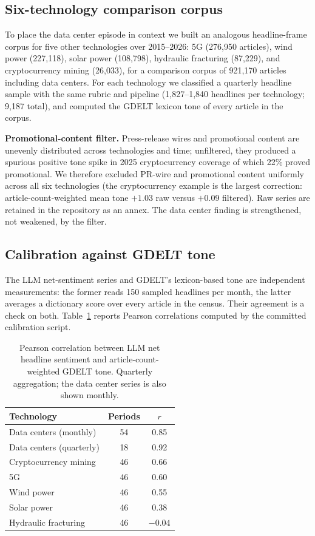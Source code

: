 \documentclass[11pt]{article}
\begin{document}
\subsection{Six-technology comparison corpus}

To place the data center episode in context we built an analogous
headline-frame corpus for five other technologies over 2015--2026: 5G
(276,950 articles), wind power (227,118), solar power (108,798), hydraulic
fracturing (87,229), and cryptocurrency mining (26,033), for a comparison
corpus of 921,170 articles including data centers. For each technology we
classified a quarterly headline sample with the same rubric and pipeline
(1,827--1,840 headlines per technology; 9,187 total), and computed the
GDELT lexicon tone of every article in the corpus.

\textbf{Promotional-content filter.} Press-release wires and promotional
content are unevenly distributed across technologies and time; unfiltered,
they produced a spurious positive tone spike in 2025 cryptocurrency coverage
of which 22\% proved promotional. We therefore excluded PR-wire and
promotional content uniformly across all six technologies (the
cryptocurrency example is the largest correction: article-count-weighted
mean tone $+1.03$ raw versus $+0.09$ filtered). Raw series are retained in
the repository as an annex. The data center finding is strengthened, not
weakened, by the filter.

\subsection{Calibration against GDELT tone}
\label{sec:calibration}

The LLM net-sentiment series and GDELT's lexicon-based tone are independent
measurements: the former reads 150 sampled headlines per month, the latter
averages a dictionary score over every article in the census. Their
agreement is a check on both. Table~\ref{tab:calibration} reports Pearson
correlations computed by the committed calibration script.

\begin{table}[t]
\centering
\caption{Pearson correlation between LLM net headline sentiment and
article-count-weighted GDELT tone. Quarterly aggregation; the data center
series is also shown monthly.}
\label{tab:calibration}
\begin{tabular}{lcc}
\toprule
Technology & Periods & $r$ \\
\midrule
Data centers (monthly) & 54 & 0.85 \\
Data centers (quarterly) & 18 & 0.92 \\
Cryptocurrency mining & 46 & 0.66 \\
5G & 46 & 0.60 \\
Wind power & 46 & 0.55 \\
Solar power & 46 & 0.38 \\
Hydraulic fracturing & 46 & $-0.04$ \\
\bottomrule
\end{tabular}
\end{table}
\end{document}
